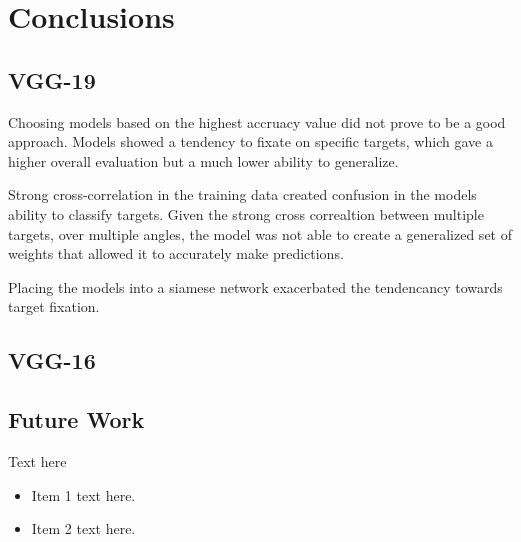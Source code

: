 \chapter{Conclusions}
\label{ch:conclusion}
\glsresetall
{

	\section{VGG-19}
	Choosing models based on the highest accruacy value did not prove to be a good approach. Models showed a tendency to fixate on specific targets, which gave a higher overall evaluation but a much lower ability to generalize.

	Strong cross-correlation in the training data created confusion in the models ability to classify targets. Given the strong cross correaltion between multiple targets, over multiple angles, the model was not able to create a generalized set of weights that allowed it to accurately make predictions.

	Placing the models into a siamese network exacerbated the tendencancy towards target fixation.

	\section{VGG-16}

	

}
\section{Future Work}
{
Text here

\begin{itemize} %

	\item Item 1 text here.

	\item Item 2 text here.

\end{itemize}
}
